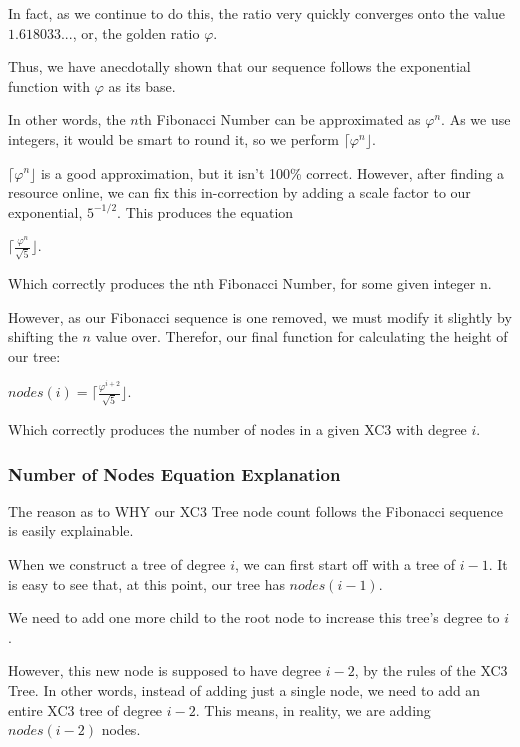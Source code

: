 \documentclass{article}
\begin{document}
In fact, as we continue to do this, the ratio very quickly converges onto the value $1.618033...$, or, the golden ratio $\varphi$.

Thus, we have anecdotally shown that our sequence follows the exponential function with $\varphi$ as its base.

In other words, the $n$th Fibonacci Number can be approximated as $\varphi^{n}$. As we use integers, it would be smart to round it, so we perform $\lceil \varphi^{n} \rfloor$.

$\lceil \varphi^{n} \rfloor$ is a good approximation, but it isn't 100\% correct. However, after finding a resource online, we can fix this in-correction by adding a scale factor to our exponential, $5^{-1/2}$. This produces the equation

{
\Large
\begin{center}
    $\lceil \frac{\varphi^{n}}{\sqrt{5}} \rfloor$.\\
    $ $
\end{center}
}
Which correctly produces the nth Fibonacci Number, for some given integer n.

However, as our Fibonacci sequence is one removed, we must modify it slightly by shifting the $n$ value over. Therefor, our final function for calculating the height of our tree:


{
\Large
\begin{center}
    $nodes(i) = \lceil \frac{\varphi^{i+2}}{\sqrt{5}} \rfloor$.\\
    $ $
\end{center}
}
Which correctly produces the number of nodes in a given XC3 with degree $i$.


\subsubsection{Number of Nodes Equation Explanation}

The reason as to WHY our XC3 Tree node count follows the Fibonacci sequence is easily explainable.

When we construct a tree of degree $i$, we can first start off with a tree of $i-1$. It is easy to see that, at this point, our tree has $nodes(i-1)$.


We need to add one more child to the root node to increase this tree's degree to $i$.

However, this new node is supposed to have degree $i-2$, by the rules of the XC3 Tree. In other words, instead of adding just a single node, we need to add an entire XC3 tree of degree $i-2$. This means, in reality, we are adding $nodes(i-2)$ nodes.
\end{document}
